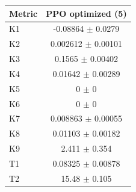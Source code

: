 \begin{tabular}{lc}
\toprule
Metric & PPO optimized (5) \\
\midrule
K1 & -0.08864 $\pm$ 0.0279 \\
K2 & 0.002612 $\pm$ 0.00101 \\
K3 & 0.1565 $\pm$ 0.00402 \\
K4 & 0.01642 $\pm$ 0.00289 \\
K5 & 0 $\pm$ 0 \\
K6 & 0 $\pm$ 0 \\
K7 & 0.008863 $\pm$ 0.00055 \\
K8 & 0.01103 $\pm$ 0.00182 \\
K9 & 2.411 $\pm$ 0.354 \\
T1 & 0.08325 $\pm$ 0.00878 \\
T2 & 15.48 $\pm$ 0.105 \\
\bottomrule
\end{tabular}
